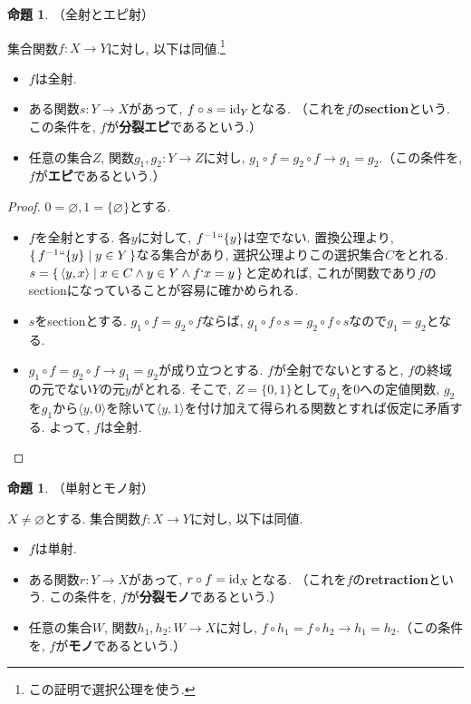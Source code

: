 \documentclass[a4paper, twoside]{bxjsarticle}
\theoremstyle{definition}
\newtheorem{prop}[thm]{命題}
\begin{document}
        \begin{prop}
            （全射とエピ射）
            
            集合関数$f\colon X\to Y$に対し, 以下は同値.\footnote{この証明で選択公理を使う.}
            \begin{itemize}
                \item $f$は全射.
                \item ある関数$s\colon Y\to X$があって, $f\circ s = {\rm id}_Y$となる. （これを$f$の\textbf{section}という. この条件を, $f$が\textbf{分裂エピ}であるという.）
                \item 任意の集合$Z$, 関数$g_1, g_2\colon Y\to Z$に対し, $g_1\circ f = g_2\circ f \to g_1 = g_2$.（この条件を, $f$が\textbf{エピ}であるという.）
            \end{itemize}            
        \end{prop}
        \begin{proof}
            $0 = \varnothing, 1 = \{\varnothing\}$とする.
            \begin{itemize}
                \item $f$を全射とする. 各$y$に対して, $f^{-1}``\{y\}$は空でない. 置換公理より, $\set{f^{-1}``\{y\}|y\in Y}$なる集合があり, 選択公理よりこの選択集合$C$をとれる. $s = \set{\langle y, x\rangle| x\in C \land y\in Y \land f`x = y }$と定めれば, これが関数であり$f$のsectionになっていることが容易に確かめられる.
                \item $s$をsectionとする. $g_1\circ f = g_2\circ f$ならば, $g_1\circ f\circ s = g_2\circ f\circ s$なので$g_1 = g_2$となる.
                \item $g_1\circ f = g_2\circ f \to g_1 = g_2$が成り立つとする. $f$が全射でないとすると, $f$の終域の元でない$Y$の元$y$がとれる. そこで, $Z=\{0, 1\}$として$g_1$を$0$への定値関数, $g_2$を$g_1$から$\langle y, 0\rangle$を除いて$\langle y, 1\rangle$を付け加えて得られる関数とすれば仮定に矛盾する. よって, $f$は全射.
            \end{itemize}
        \end{proof}
        \begin{prop}
            （単射とモノ射）
            
            $X\neq \varnothing$とする. 集合関数$f\colon X\to Y$に対し, 以下は同値.
            \begin{itemize}
                \item $f$は単射.
                \item ある関数$r\colon Y\to X$があって, $r\circ f = {\rm id}_X$となる. （これを$f$の\textbf{retraction}という. この条件を, $f$が\textbf{分裂モノ}であるという.）
                \item 任意の集合$W$, 関数$h_1, h_2\colon W\to X$に対し, $f\circ h_1 = f\circ h_2 \to h_1 = h_2$.（この条件を, $f$が\textbf{モノ}であるという.）
            \end{itemize}            
        \end{prop}
\end{document}
